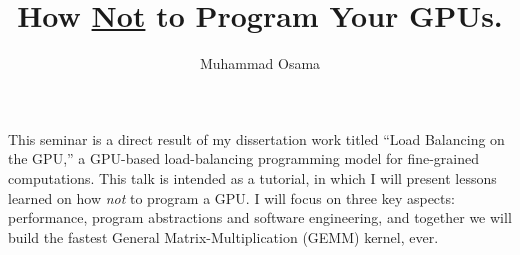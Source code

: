 \documentclass[12pt]{amsart}
\title{How \underline{Not} to Program Your GPUs.}
\author{Muhammad Osama}
\begin{document}
\maketitle	

This seminar is a direct result of my dissertation work titled ``Load Balancing on the GPU,'' a GPU-based load-balancing programming model for fine-grained computations. This talk is intended as a tutorial, in which I will present lessons learned on how \emph{not} to program a GPU. I will focus on three key aspects: performance, program abstractions and software engineering, and together we will build the fastest General Matrix-Multiplication (GEMM) kernel, ever.

\end{document}
